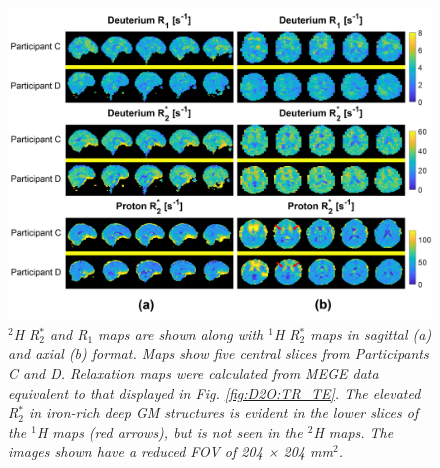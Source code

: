 \begin{figure}[H]
    \centering
    \includegraphics[width=1\textwidth]{Figures/D2O/R1_R2.png}
    \caption{\textit{$^2$H R$_2^*$ and R$_1$ maps are shown along with $^1$H R$_2^*$ maps in sagittal (a) and axial (b) format. Maps show five central slices from Participants C and D. Relaxation maps were calculated from MEGE data equivalent to that displayed in Fig. \ref{fig:D2O:TR_TE}. The elevated R$_2^*$ in iron-rich deep GM structures is evident in the lower slices of the $^1$H maps (red arrows), but is not seen in the $^2$H maps. The images shown have a reduced FOV of 204 × 204 mm$^2$.}}
    \label{fig:D2O:R1_R2}
\end{figure}



